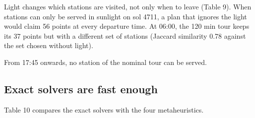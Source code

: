\documentclass[11pt,a4paper]{article}
\begin{document}
Light changes which stations are visited, not only when to leave (Table 9). When stations can only be served in sunlight on sol 4711, a plan that ignores the light would claim 56 points at every departure time. At 06:00, the 120 min tour keeps its 37 points but with a different set of stations (Jaccard similarity 0.78 against the set chosen without light).

\begin{table}[H]
\centering\small
\caption{Points of the station tours against the departure time when stations need light (local true solar time, waiting at 0 W).}
\end{table}

From 17:45 onwards, no station of the nominal tour can be served.

\subsection{Exact solvers are fast enough}

Table 10 compares the exact solvers with the four metaheuristics.

\begin{table}[H]
\centering\small
\caption{Exact solvers against four metaheuristics. Share of instances solved to optimality, mean gap and median time.}
\end{table}
\end{document}
